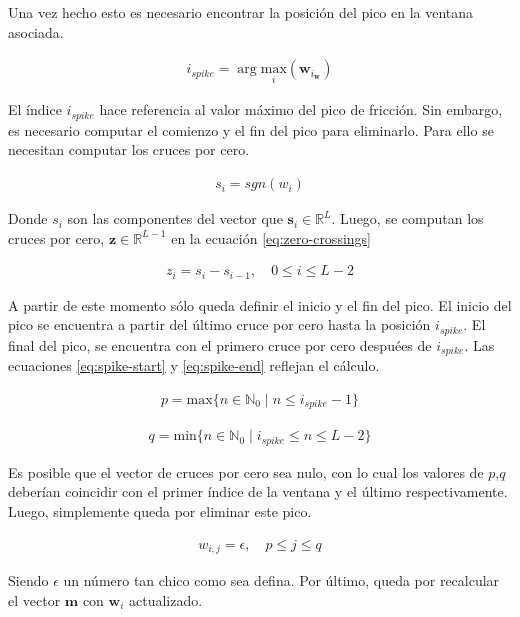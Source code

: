 \indent Una vez hecho esto es necesario encontrar la posición del pico en la ventana asociada.

\begin{align}
    i_{spike} = \arg \underset{i}{\mathrm{max}} (\bm{w}_{i_{\bm{w}}})
\end{align}

\indent El índice $i_{spike}$ hace referencia al valor máximo del pico de fricción. Sin embargo, es necesario computar el comienzo y el fin del pico para eliminarlo. Para ello se necesitan computar los cruces por cero.

\begin{align}
    s_i = sgn(w_i)
\end{align}

\indent Donde $s_i$ son las componentes del vector que $\mathbf{s}_i \in \mathbb{R}^L$. Luego, se computan los cruces por cero, $\mathbf{z} \in \mathbb{R}^{L-1}$ en la ecuación \ref{eq:zero-crossings}

\begin{align} \label{eq:zero-crossings}
    z_i = s_i - s_{i-1}, \quad 0 \leq i \leq L-2
\end{align}

\indent A partir de este momento sólo queda definir el inicio y el fin del pico. El inicio del pico se encuentra a partir del último cruce por cero hasta la posición $i_{spike}$. El final del pico, se encuentra con el primero cruce por cero despuées de $i_{spike}$. Las ecuaciones \ref{eq:spike-start} y \ref{eq:spike-end} reflejan el cálculo.

\begin{align} \label{eq:spike-start}
    p = \mathrm{max}\big\{n \in \mathbb{N}_0 \; | \; n \leq i_{spike}-1\big\}
\end{align}

\begin{align} \label{eq:spike-end}
    q = \mathrm{min}\big\{n \in \mathbb{N}_0 \; | \; i_{spike} \leq n \leq L-2\big\}
\end{align}

\indent Es posible que el vector de cruces por cero sea nulo, con lo cual los valores de $p$,$q$ deberían coincidir con el primer índice de la ventana y el último respectivamente. Luego, simplemente queda por eliminar este pico.

\begin{align}
    w_{i,j} = \epsilon, \quad p \leq j \leq q
\end{align}

\indent Siendo $\epsilon$ un número tan chico como sea defina. Por último, queda por recalcular el vector $\mathbf{m}$ con $\mathbf{w}_i$ actualizado. \bigskip

